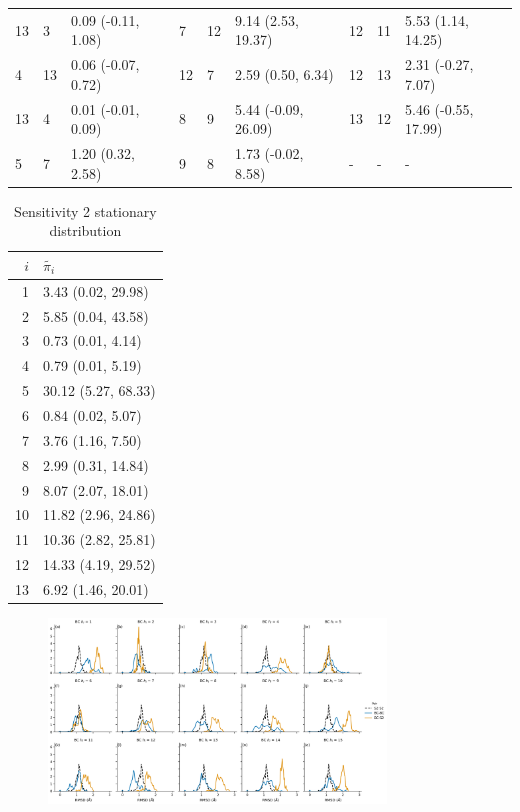 \begin{table}[]
\begin{tabular}{lllllllll}
     13 &   3 &     0.09 (-0.11, 1.08) &   7 &  12 &    9.14 (2.53, 19.37) &  12 &  11 &   5.53 (1.14, 14.25) \\
      4 &  13 &     0.06 (-0.07, 0.72) &  12 &   7 &     2.59 (0.50, 6.34) &  12 &  13 &   2.31 (-0.27, 7.07) \\
     13 &   4 &     0.01 (-0.01, 0.09) &   8 &   9 &   5.44 (-0.09, 26.09) &  13 &  12 &  5.46 (-0.55, 17.99) \\
      5 &   7 &      1.20 (0.32, 2.58) &   9 &   8 &    1.73 (-0.02, 8.58) &   - &   - &                    - \\
    \hline
    \end{tabular}
\end{table}

\begin{table}
    \centering
    \caption{Sensitivity 2 stationary distribution}
    \label{tab:my_label}
   \begin{tabular}{rl}
    \toprule
     $i$ &    $\tilde{\pi_{i}}$ \\
    \midrule
       1 &   3.43 (0.02, 29.98) \\
       2 &   5.85 (0.04, 43.58) \\
       3 &    0.73 (0.01, 4.14) \\
       4 &    0.79 (0.01, 5.19) \\
       5 &  30.12 (5.27, 68.33) \\
       6 &    0.84 (0.02, 5.07) \\
       7 &    3.76 (1.16, 7.50) \\
       8 &   2.99 (0.31, 14.84) \\
       9 &   8.07 (2.07, 18.01) \\
      10 &  11.82 (2.96, 24.86) \\
      11 &  10.36 (2.82, 25.81) \\
      12 &  14.33 (4.19, 29.52) \\
      13 &   6.92 (1.46, 20.01) \\
    \bottomrule
    \end{tabular}
\end{table}

\begin{figure}
    \centering
    \label{fig:sens_2_overlap}
    \includegraphics[width=0.8\textwidth]{chapters/aadh/figures/sensitivity_2_5_overlap.png}

\end{figure}

